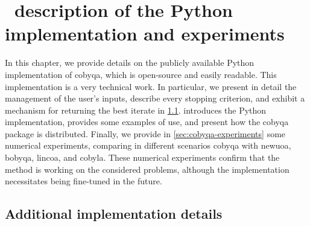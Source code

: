 %
%
%
\chapter{ \textemdash\ description of the Python implementation and experiments}
\label{ch:cobyqa-implementation}

In this chapter, we provide details on the publicly available Python implementation of \gls{cobyqa}, which is open-source and easily readable.
This implementation is a very technical work.
In particular, we present in detail the management of the user's inputs, describe every stopping criterion, and exhibit a mechanism for returning the best iterate in \cref{sec:implementation-details}.
 introduces the Python implementation, provides some examples of use, and present how the \gls{cobyqa} package is distributed.
Finally, we provide in \cref{sec:cobyqa-experiments} some numerical experiments, comparing in different scenarios \gls{cobyqa} with \gls{newuoa}, \gls{bobyqa}, \gls{lincoa}, and \gls{cobyla}.
These numerical experiments confirm that the method is working on the considered problems, although the implementation necessitates being fine-tuned in the future.


\section{Additional implementation details}
\label{sec:implementation-details}

